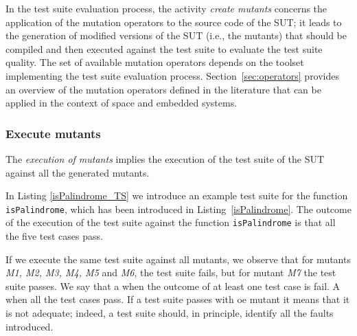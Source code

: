 
In the test suite evaluation process, the activity \emph{create mutants} concerns the application of the mutation operators to the source code of the SUT; it leads to the generation of modified versions of the SUT (i.e., the mutants) that should be compiled and then executed against the test suite to evaluate the test suite quality. 
The set of available mutation operators depends on the toolset implementing the test suite evaluation process.
Section~\ref{sec:operators} provides an overview of the mutation operators defined in the literature that can be applied in the context of space and embedded systems.

\subsubsection{Execute mutants}


The \emph{execution of mutants} implies the execution of the test suite of the SUT against all the generated mutants. 





In Listing \ref{isPalindrome_TS} we introduce an example test suite for the function \texttt{isPalindrome}, which has been introduced in Listing~\ref{isPalindrome}. 
The outcome of the execution of the test suite against the function \texttt{isPalindrome} is that all the five test cases pass.

If we execute the same test suite against all mutants, we observe that for mutants \textit{M1, M2, M3, M4, M5} and \textit{M6}, the test suite fails, but for mutant \textit{M7} the test suite passes. We say that a  when the outcome of at least one test case is fail. A  when all the test cases pass. If a test suite passes with oe mutant it means that it is not adequate; indeed, a test suite should, in principle, identify all the faults introduced.

